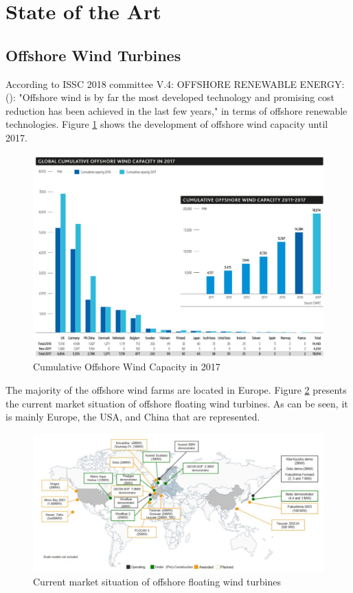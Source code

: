 \section{State of the Art}
\subsection{Offshore Wind Turbines}
According to ISSC 2018 committee V.4: OFFSHORE RENEWABLE ENERGY: (\cite{Gao2018}): "Offshore wind is by far the most developed technology and
promising cost reduction has been achieved in the last few years," in terms of offshore renewable technologies. Figure \ref{fig:sit17} shows the development of offshore wind capacity until 2017. 

\begin{figure}[H]
\centering
\includegraphics[scale=0.8]{figures/sit17}
\caption[$\; \:$Cumulative Offshore Wind Capacity in 2017]{Cumulative Offshore Wind Capacity in 2017 \cite{GWEC2018}}
 \label{fig:sit17}
\end{figure}

\noindent The majority of the offshore wind farms are located in Europe. Figure \ref{fig:world} presents the current market situation of offshore floating wind turbines. As can be seen, it is mainly Europe, the USA, and China that are represented. 


\begin{figure}[H]
\centering
\includegraphics[scale=0.54]{figures/world}
\caption[$\; \:$Current market situation of offshore floating wind turbines]{Current market situation of offshore floating wind turbines \cite{Gao2018}}
 \label{fig:world}
\end{figure}

